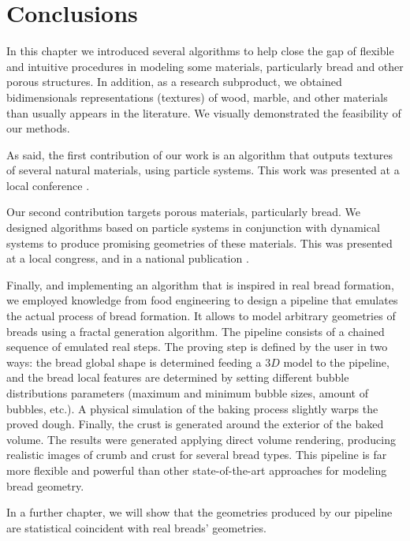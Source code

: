 




\section{Conclusions}

In this chapter we introduced several algorithms to help close the gap of flexible and intuitive procedures in modeling some materials, particularly bread and other porous structures.
In addition, as a research subproduct, we obtained bidimensionals representations (textures) of wood, marble, and other materials than usually appears in the literature.
We visually demonstrated the feasibility of our methods.

As said, the first contribution of our work is an algorithm that outputs textures of several natural materials, using particle systems.
This work was presented at a local conference \cite{Baravalle2011}.

Our second contribution targets porous materials, particularly bread.
We designed algorithms based on particle systems in conjunction with dynamical systems to produce promising geometries of these materials.
This was presented at a local congress, and in a national publication \cite{Baravalle2014}.

Finally, and implementing an algorithm that is inspired in real bread formation, we employed knowledge from food engineering to design a pipeline that emulates the actual process of bread formation.
It allows to model arbitrary geometries of breads using a fractal generation algorithm.
The pipeline consists of a chained sequence of emulated real steps.
The proving step is defined by the user in two ways: the bread global shape is determined feeding a $3D$ model to the pipeline, and the bread local features are determined by setting different bubble distributions parameters (maximum and minimum bubble sizes, amount of bubbles, etc.).
A physical simulation of the baking process slightly warps the proved dough.
Finally, the crust is generated around the exterior of the baked volume.
The results were generated applying direct volume rendering, producing realistic images of crumb and crust for several bread types.
This pipeline is far more flexible and powerful than other state-of-the-art approaches for modeling bread geometry.

In a further chapter, we will show that the geometries produced by our pipeline are statistical coincident with real breads' geometries.


